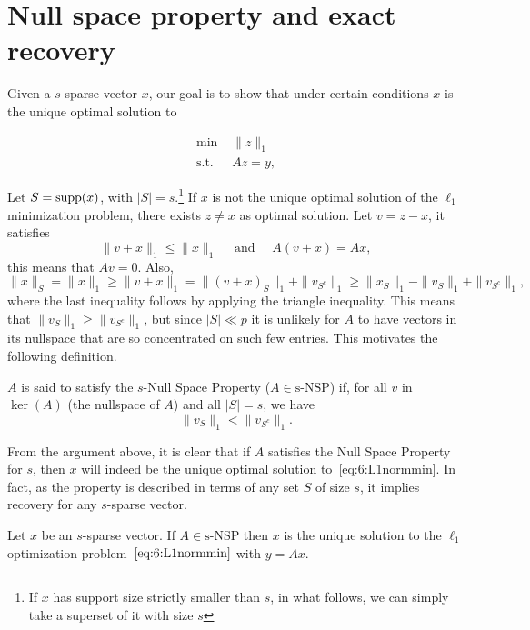 \section{Null space property and exact recovery}
\label{s:nsp}

Given a $s$-sparse vector $x$, our goal is to show that under certain conditions $x$ is the unique optimal solution to

\begin{equation}
\begin{array}{cl}
\min \,\, & \|z\|_1 \\
\text{s.t.} & Az = y,
\end{array}
\end{equation}

Let $S = \operatorname{supp}(x)$, with $|S|=s$.\footnote{If $x$ has support size strictly smaller than $s$, in what follows, we can simply take a superset of it with size $s$} If $x$ is not the unique optimal solution of the $\ell_1$ minimization problem, there exists $z\neq x$ as optimal solution. Let $v = z-x$, it satisfies
\[
\|v+x\|_1 \leq \|x\|_1 \quad \text{ and } \quad A( v+x ) = Ax,
\]
this means that $Av=0$. Also, 
$$\|x\|_S = \|x\|_1 \geq \|v+x\|_1 = \|\left(v+x\right)_S\|_1 + \|v_{S^c}\|_1 \geq \|x_S\|_1 - \|v_S\|_1 + \|v_{S^c}\|_1,$$ where the last inequality follows by applying the triangle inequality. This means that $\|v_S\|_1 \geq \|v_{S^c}\|_1$, but since $|S|\ll p$ it is unlikely for $A$ to have vectors in its nullspace that are so concentrated on such few entries. This motivates the following definition.

\begin{definition}\label{def:nullspace}
$A$ is said to satisfy the $s$-Null Space Property ($A\in \text{s-NSP}$) if, for all $v$ in $\ker(A)$ (the nullspace of $A$) and all $|S| = s$, we have
\[
\|v_S\|_1 < \|v_{S^c}\|_1.
\]
\end{definition}

From the argument above, it is clear that if $A$ satisfies the Null Space Property for $s$, then $x$ will indeed be the unique optimal solution to~\eqref{eq:6:L1normmin}. In fact, as the property is described in terms of any set $S$ of size $s$, it implies recovery for any $s$-sparse vector.

\begin{theorem}\label{thm:NSPimpliesRecovery}
Let $x$ be an $s$-sparse vector. If $A\in\text{s-NSP}$ then $x$ is the unique solution to the $\ell_1$ optimization problem~$\eqref{eq:6:L1normmin}$ with $y=Ax$.
\end{theorem}

